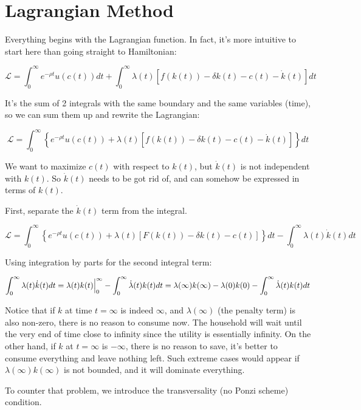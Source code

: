 \documentclass[11pt,a4paper]{book}
\theoremstyle{definition}\newtheorem{definition}{Definition}
\theoremstyle{definition}\newtheorem{fact}{Fact}
\theoremstyle{definition}\newtheorem{remark}{Remark}
\theoremstyle{definition}\newtheorem{ex}{Ex.}
\theoremstyle{definition}\newtheorem{project}{Project}
\theoremstyle{definition}\newtheorem{problem}{Problem}
\theoremstyle{definition}\newtheorem{example}{Example}
\numberwithin{theorem}{section}
\numberwithin{corollary}{chapter}
\numberwithin{assumption}{chapter}
\numberwithin{definition}{chapter}
\numberwithin{prop}{chapter}
\numberwithin{notation}{chapter}
\numberwithin{problem}{chapter}
\numberwithin{example}{chapter}
\numberwithin{fact}{chapter}
\numberwithin{ex}{chapter}
\begin{document}
	
	\section{Lagrangian Method}
	Everything begins with the Lagrangian function. In fact, it's more intuitive to start here than going straight to Hamiltonian:

$$
    \mathcal{L} = \int_{0}^{\infty} e^{-\rho t} u(c(t)) dt + \int_{0}^{\infty} \lambda(t) \left[ f( k(t)) - \delta k(t) - c(t) - \dot{k}(t) \right] dt
$$

It's the sum of 2 integrals with the same boundary and the same variables (time), so we can sum them up and rewrite the Lagrangian:

$$
    \mathcal{L} = \int_{0}^{\infty} \left\{ e^{-\rho t} u(c(t)) + \lambda(t) \left[ f( k(t)) - \delta k(t) - c(t) - \dot{k}(t) \right] \right\} dt
$$

We want to maximize $c(t)$ with respect to $k(t)$, but $\dot{k}(t)$ is not independent with $k(t)$. So $\dot{k}(t)$ needs to be got rid of, and can somehow be expressed in terms of $k(t)$.

First, separate the $\dot{k}(t)$ term from the integral.

$$
    \mathcal{L} = \int_{0}^{\infty} \left\{ e^{-\rho t} u(c(t)) + \lambda(t) \left[ F( k(t)) - \delta k(t) - c(t)  \right] \right\} dt - \int_{0}^{\infty} \lambda(t)\dot{k}(t)dt
$$

Using integration by parts  for the second integral term:

$$
     \int_{0}^{\infty} \lambda(t) \dot{k}(t) dt                                               \\
     = \lambda(t) k(t) \Big|_0^\infty - \int_{0}^{\infty} \dot{\lambda}(t)k(t)dt              \\
     = \lambda(\infty) k(\infty) - \lambda(0) k(0) - \int_{0}^{\infty} \dot{\lambda}(t)k(t)dt 
$$

Notice that if $k$ at time $t=\infty$ is indeed $\infty$, and $\lambda(\infty)$ (the penalty term) is also non-zero, there is no reason to consume now. The household will wait until the very end of time close to infinity since the utility is essentially infinity. On the other hand, if $k$ at $t=\infty$ is $-\infty$, there is no reason to save, it's better to consume everything and leave nothing left. Such extreme cases would appear if $\lambda(\infty)k(\infty)$ is not bounded, and it will dominate everything.

To counter that problem, we introduce the transversality (no Ponzi scheme) condition.
\end{document}
